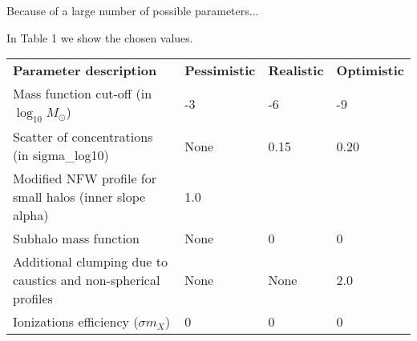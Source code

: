 Because of a large number of possible parameters...

In Table 1 we show the chosen values.

\begin{table}
    \begin{tabular}{llll}
    \textbf{Parameter description}                                    & \textbf{Pessimistic} & \textbf{Realistic} & \textbf{Optimistic} \hline \hline \\
    Mass function cut-off (in $\log_{10}M_\odot$)        & -3 & -6 & -9 \\
    Scatter of concentrations (in sigma\_log10)              & None & 0.15 & 0.20 \\
    Modified NFW profile for small halos (inner slope alpha) & 1.0 & \cite{Ishiyama_2014} &  \cite{Ishiyama_2014} \\
    Subhalo mass function & None & 0 & 0 \\
    Additional clumping due to caustics and non-spherical profiles & None & None & 2.0
\\    
    Ionizations efficiency ($\sigma m_X$) & 0 & 0 & 0
\\    \end{tabular}
\end{table}
